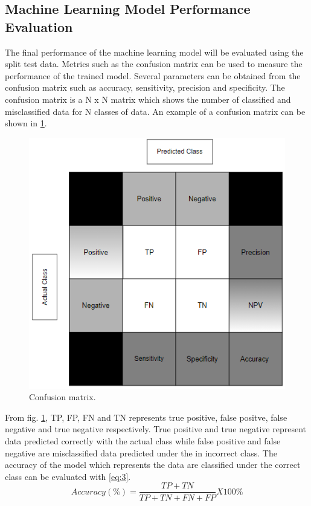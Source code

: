 \subsection{Machine Learning Model Performance Evaluation}
The final performance of the machine learning model will be evaluated using the split test data. Metrics such as the confusion matrix can be used to measure the performance of the trained model. Several parameters can be obtained from the confusion matrix such as accuracy, sensitivity, precision and specificity. The confusion matrix is a N x N matrix which shows the number of classified and misclassified data for N classes of data. An example of a confusion matrix can be shown in \ref{fig_cf}.

\begin{figure} [ht]
    \centering
    \includegraphics[scale=1.0]{pages/Chapter2/Chapter 2 images/Confusion matrix.PNG}
    \caption{Confusion matrix.}
    \label{fig_cf}
\end{figure}

From fig. \ref{fig_cf}, TP, FP, FN and TN represents true positive, false positve, false negative and true negative respectively. True positive and true negative represent data predicted correctly with the actual class while false positive and false negative are misclassified data predicted under the in incorrect class.
The accuracy of the model which represents the data are classified under the correct class can be evaluated with \ref{eq:3}.
\begin{equation}
    Accuracy(\%) = \frac{TP + TN}{TP+TN+FN+FP} X100\% 
    \label{eq:3}
\end{equation}

